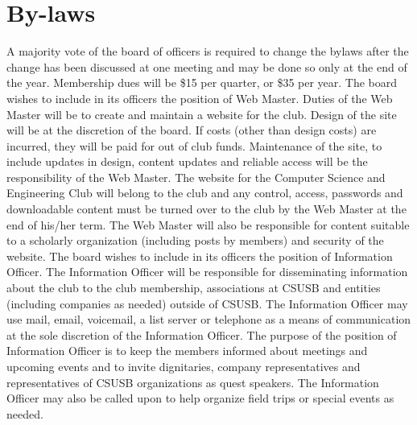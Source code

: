 \documentclass{article}
\begin{document}
\section{\large By-laws}
A majority vote of the board of officers is required to change the bylaws after the change has been discussed at one meeting and may be done so only at the end of the year.
Membership dues will be \$15 per quarter, or \$35 per year.
The board wishes to include in its officers the position of Web Master. Duties of the Web Master will be to create and maintain a website for the club. Design of the site will be at the discretion of the board. If costs (other than design costs) are incurred, they will be paid for out of club funds. Maintenance of the site, to include updates in design, content updates and reliable access will be the responsibility of the Web Master. The website for the Computer Science and Engineering Club will belong to the club and any control, access, passwords and downloadable content must be turned over to the club by the Web Master at the end of his/her term. The Web Master will also be responsible for content suitable to a scholarly organization (including posts by members) and security of the website.
The board wishes to include in its officers the position of Information Officer. The Information Officer will be responsible for disseminating information about the club to the club membership, associations at CSUSB and entities (including companies as needed) outside of CSUSB.  The Information Officer may use mail, email, voicemail, a list server or telephone as a means of communication at the sole discretion of the Information Officer. The purpose of the position of Information Officer is to keep the members informed about meetings and upcoming events and to invite dignitaries, company representatives and representatives of CSUSB organizations as quest speakers.  The Information Officer may also be called upon to help organize field trips or special events as needed.
\end{document}
